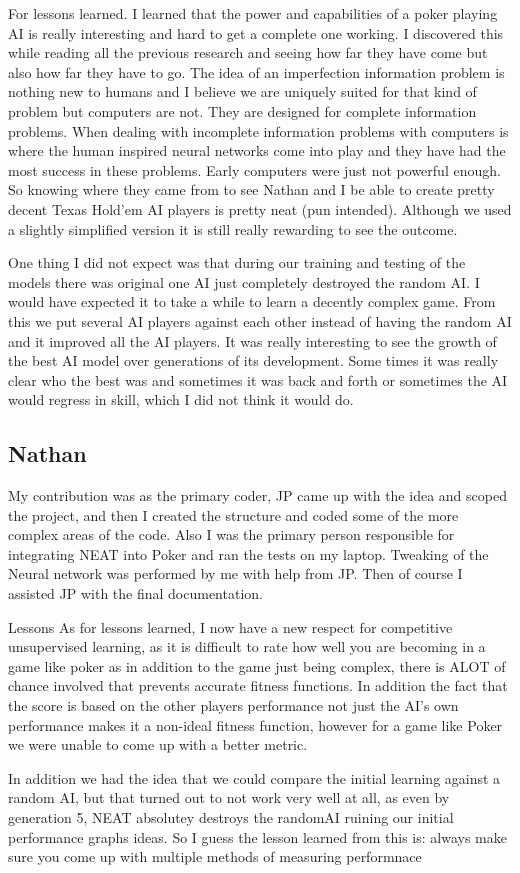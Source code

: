 For lessons learned. I learned that the power and capabilities of a poker playing AI is really interesting and hard to get a complete one working. I discovered this while reading all the previous research and seeing how far they have come but also how far they have to go. The idea of an imperfection information problem is nothing new to humans and I believe we are uniquely suited for that kind of problem but computers are not. They are designed for complete information problems. When dealing with incomplete information problems with computers is where the human inspired neural networks come into play and they have had the most success in these problems. Early computers were just not powerful enough. So knowing where they came from to see Nathan and I be able to create pretty decent Texas Hold'em AI players is pretty neat (pun intended). Although we used a slightly simplified version it is still really rewarding to see the outcome. 

One thing I did not expect was that during our training and testing of the models there was original one AI just completely destroyed the random AI. I would have expected it to take a while to learn a decently complex game. From this we put several AI players against each other instead of having the random AI and it improved all the AI players. It was really interesting to see the growth of the best AI model over generations of its development. Some times it was really clear who the best was and sometimes it was back and forth or sometimes the AI would regress in skill, which I did not think it would do.
\subsection{Nathan}
My contribution was as the primary coder, JP came up with the idea and scoped the project, and then I created
the structure and coded some of the more complex areas of the code. Also I was the primary person responsible
for integrating NEAT into Poker and ran the tests on my laptop. Tweaking of the Neural network was performed
by me with help from JP. Then of course I assisted JP with the final documentation.

Lessons As for lessons learned, I now have a new respect for competitive unsupervised learning, as it is
difficult to rate how well you are becoming in a game like poker as in addition to the game just being complex,
there is ALOT of chance involved that prevents accurate fitness functions. In addition the fact that the score
is based on the other players performance not just the AI's own performance makes it a non-ideal fitness
function, however for a game like Poker we were unable to come up with a better metric.

In addition we had the idea that we could compare the initial learning against a random AI, but that turned out
to not work very well at all, as even by generation 5, NEAT absolutey destroys the randomAI ruining our initial
performance graphs ideas. So I guess the lesson learned from this is: always make sure you come up with multiple
methods of measuring performnace


